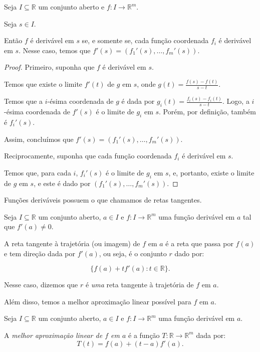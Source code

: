 \begin{proposition}
    Seja $I\subseteq \mathbb R$ um conjunto aberto e $f: I\rightarrow \mathbb R^m$.

    Seja $s \in I$.
    
    Então $f$ é derivável em $s$ se, e somente se, cada função coordenada $f_i$ é derivável em $s$.
    Nesse caso, temos que $f'(s) = (f_1'(s), \dots, f_m'(s))$.
\end{proposition}
\begin{proof}
    Primeiro, suponha que $f$ é derivável em $s$.

    Temos que existe o limite $f'(t)$ de $g$ em $s$, onde $g(t) = \frac{f(s)-f(t)}{s-t}$.

    Temos que a $i$-ésima coordenada de $g$ é dada por $g_i(t) = \frac{f_i(s)-f_i(t)}{s-t}$.
    Logo, a $i$-ésima coordenada de $f'(s)$ é o limite de $g_i$ em $s$. Porém, por definição, também é $f_i'(s)$.

    Assim, concluímos que $f'(s) = (f_1'(s), \dots, f_m'(s))$.

    Reciprocamente, suponha que cada função coordenada $f_i$ é derivável em $s$.

    Temos que, para cada $i$, $f_i'(s)$ é o limite de $g_i$ em $s$, e, portanto, existe o limite de $g$ em $s$, e este é dado por $(f_1'(s), \dots, f_m'(s))$.
\end{proof}

Funções deriváveis possuem o que chamamos de retas tangentes.
\begin{definition}
    Seja $I\subseteq \mathbb R$ um conjunto aberto, $a \in I$ e $f: I\rightarrow \mathbb R^m$ uma função derivável em $a$ tal que $f'(a)\neq 0$.

    A reta tangente à trajetória (ou imagem) de $f$ em $a$ é a reta que passa por $f(a)$ e tem direção dada por $f'(a)$, ou seja, é o conjunto $r$ dado por:

    \begin{equation*}
        \{f(a) + t f'(a) : t \in \mathbb R\}.
    \end{equation*}

    Nesse caso, dizemos que $r$ é \emph{uma} reta tangente à trajetória de $f$ em $a$.
\end{definition}

Além disso, temos a melhor aproximação linear possível para $f$ em $a$.
\begin{definition}
    Seja $I\subseteq \mathbb R$ um conjunto aberto, $a \in I$ e $f: I\rightarrow \mathbb R^m$ uma função derivável em $a$.

    A \emph{melhor aproximação linear de $f$ em $a$} é a função $T: \mathbb R \to \mathbb R^m$ dada por:
    \begin{equation*}
        T(t) = f(a) + (t-a)f'(a).
    \end{equation*}
\end{definition}

